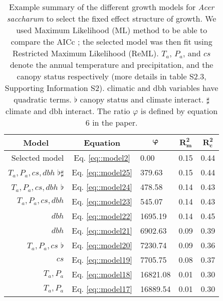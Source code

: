 \documentclass[letterpaper, 12pt]{article}
\theoremstyle{theo}
\begin{document}
\begin{refsection}
\begin{onehalfspace}
\begin{table}
	\centering
	\caption[Summary for \textit{Acer saccharum} (growth)]{Example summary of the different growth models for \textit{Acer saccharum} to select the fixed effect structure of growth. We used Maximum Likelihood (ML) method to be able to compare the AICc \citep{AICcmodavg}; the selected model was then fit using Restricted Maximum Likelihood (ReML). $ T_a $, $ P_a $, and $ cs $ denote the annual temperature and precipitation, and the canopy status respectively (more details in table S2.3, Supporting Information S2). \dag climatic and dbh variables have quadratic terms. $ \flat $ canopy status and climate interact. $ \sharp $ climate and dbh interact. The ratio $ \varphi $ is defined by equation 6 in the paper. \label{tab::acsa_fixeff}}
	\begin{tabular}{@{}rclll@{}}
	\toprule
	\multicolumn{1}{c}{\textbf{Model}} & \multicolumn{1}{c}{\textbf{Equation}} & \multicolumn{1}{c}{$ \bm{\varphi} $} & \multicolumn{1}{c}{$ \bm{R^2_m} $} & \multicolumn{1}{c}{$ \bm{R^2_c} $} \\
	\midrule
		Selected model & Eq. \ref{eq::model2} & 0.00 & 0.15 & 0.44 \\
		$ T_a, P_a, cs, dbh $ \dag $ \flat \sharp $ & Eq. \ref{eq::model25} & 379.63 & 0.15 & 0.44 \\
		$ T_a, P_a, cs, dbh $ \dag $ \flat $ & Eq. \ref{eq::model24} & 478.58 & 0.14 & 0.43 \\
		$ T_a, P_a, cs, dbh $ \dag & Eq. \ref{eq::model23} & 545.07 & 0.14 & 0.43 \\
		$ dbh $ \dag & Eq. \ref{eq::model22} & 1695.19 & 0.14 & 0.45 \\
		$ dbh $ & Eq. \ref{eq::model21} & 6902.63 & 0.09 & 0.39 \\
		$ T_a, P_a, cs $ \dag $ \flat $ & Eq. \ref{eq::model20} & 7230.74 & 0.09 & 0.36 \\
		$ cs $ & Eq. \ref{eq::model19} & 7705.75 & 0.08 & 0.37 \\
		$ T_a, P_a $ \dag & Eq. \ref{eq::model18} & 16821.08 & 0.01 & 0.30 \\
		$ T_a, P_a $ & Eq. \ref{eq::model17} & 16889.54 & 0.01 & 0.30 \\
   \bottomrule
	\end{tabular}
\end{table}


\end{onehalfspace}
\end{refsection}
\end{document}
